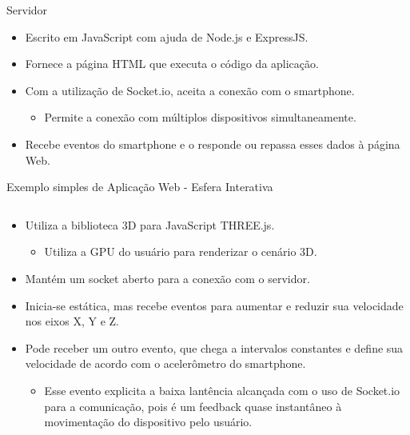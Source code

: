 \documentclass[final,hyperref={pdfpagelabels=false}]{beamer}
\begin{document}
\begin{frame}[t]
\begin{columns}[t]
\begin{column}{.465\textwidth}
\begin{block}{Servidor}
\begin{itemize}
\item Escrito em JavaScript com ajuda de Node.js e ExpressJS.
\item Fornece a página HTML que executa o código da aplicação.
\item Com a utilização de Socket.io, aceita a conexão com o smartphone.
\begin{itemize}
\item Permite a conexão com múltiplos dispositivos simultaneamente.
\end{itemize}
\item Recebe eventos do smartphone e o responde ou repassa esses dados à página Web.
\end{itemize}

\end{block}


\begin{block}{Exemplo simples de Aplicação Web - Esfera Interativa}

\begin{columns} %
\begin{column}{.54\textwidth} %

\begin{itemize}
\item Utiliza a biblioteca 3D para JavaScript THREE.js.
\begin{itemize}
\item Utiliza a GPU do usuário para renderizar o cenário 3D.
\end{itemize}
\item Mantém um socket aberto para a conexão com o servidor.
\item Inicia-se estática, mas recebe eventos para aumentar e reduzir sua velocidade nos eixos X, Y e Z.
\item Pode receber um outro evento, que chega a intervalos constantes e define sua velocidade de acordo com o acelerômetro do smartphone.
\begin{itemize}
\item Esse evento explicita a baixa lantência alcançada com o uso de Socket.io para a comunicação, pois é um feedback quase instantâneo à movimentação do dispositivo pelo usuário.
\end{itemize}
\end{itemize}


\end{column}
\end{columns}
\end{block}
\end{column}
\end{columns}
\end{frame}
\end{document}
